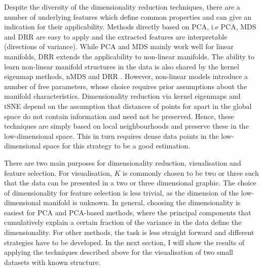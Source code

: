 Despite the diversity of the dimensionality reduction techniques, there are a number of underlying features which define common properties and can give an indication for their applicability. Methods directly based on PCA, i.e PCA, MDS and DRR are easy to apply and the extracted features are interpretable (directions of variance). While PCA and MDS mainly work well for linear manifolds, DRR extends the applicability to non-linear manifolds. The ability to learn non-linear manifold structures in the data is also shared by the kernel eigenmap methods, nMDS and DRR \citep{Coifman2006}. However, non-linear models introduce a number of free parameters, whose choice requires prior assumptions about the manifold characteristics. Dimensionality reduction via kernel eigenmaps and tSNE depend on the assumption that distances of points for apart in the global space do not contain information and need not be preserved. Hence, these techniques are simply based on local neighbourhoods and preserve these in the low-dimensional space. This in turn requires dense data points in the low-dimensional space for this strategy to be a good estimation. 

There are two main purposes for dimensionality reduction, visualisation and feature selection.  For visualisation, \(K\) is commonly chosen to be two or three such that the data can be presented in a two or three dimensional graphic. The choice of dimensionality for feature selection is less trivial, as the dimension of the low-dimensional manifold is unknown. In general, choosing the dimensionality is easiest for PCA and PCA-based methods, where the principal components that cumulatively explain a certain fraction of the variance in the data define the dimensionality. For other methods, the task is less straight forward and different strategies have to be developed.  In the next section, I will show the results of applying the techniques described above for the visualisation of two small datasets with known structure.
